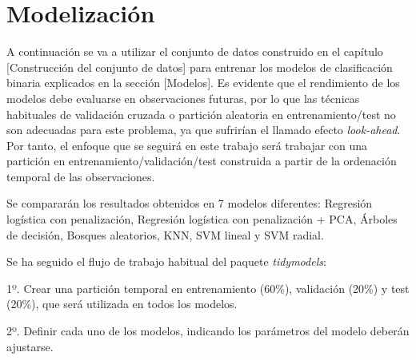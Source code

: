 \documentclass[12pt,a4paper,]{book}
\title{}
\author{Nombre Completo Autor}
\date{18/11/2021}
\def\ifdoblecara{} %
\def\ifprincipal{} %
\let\ifprincipal\undefined %
\numberwithin{dummy}{section}
\theoremstyle{ocrenumbox}
\theoremstyle{blacknumex}
\theoremstyle{blacknumbox}
\theoremstyle{ocrenum}
\theoremstyle{ocrenum}
\begin{document}




\raggedbottom

\ifdefined\ifprincipal
\else
\setlength{\parindent}{1em}
\pagestyle{fancy}
\setcounter{tocdepth}{4}
\tableofcontents

\fi

\ifdefined\ifdoblecara
\fancyhead{}{}
\fancyhead[LE,RO]{\scriptsize\rightmark}
\fancyfoot[LO,RE]{\scriptsize\slshape \leftmark}
\fancyfoot[C]{}
\fancyfoot[LE,RO]{\footnotesize\thepage}
\else
\fancyhead{}{}
\fancyhead[RO]{\scriptsize\rightmark}
\fancyfoot[LO]{\scriptsize\slshape \leftmark}
\fancyfoot[C]{}
\fancyfoot[RO]{\footnotesize\thepage}
\fi

\renewcommand{\headrulewidth}{0.4pt}
\renewcommand{\footrulewidth}{0.4pt}

\hypertarget{modelizaciuxf3n}{%
\chapter{Modelización}\label{modelizaciuxf3n}}

A continuación se va a utilizar el conjunto de datos construido en el
capítulo {[}Construcción del conjunto de datos{]} para entrenar los
modelos de clasificación binaria explicados en la sección {[}Modelos{]}.
Es evidente que el rendimiento de los modelos debe evaluarse en
observaciones futuras, por lo que las técnicas habituales de validación
cruzada o partición aleatoria en entrenamiento/test no son adecuadas
para este problema, ya que sufrirían el llamado efecto
\emph{look-ahead}. Por tanto, el enfoque que se seguirá en este trabajo
será trabajar con una partición en entrenamiento/validación/test
construida a partir de la ordenación temporal de las observaciones.

Se compararán los resultados obtenidos en 7 modelos diferentes:
Regresión logística con penalización, Regresión logística con
penalización + PCA, Árboles de decisión, Bosques aleatorios, KNN, SVM
lineal y SVM radial.

Se ha seguido el flujo de trabajo habitual del paquete
\emph{tidymodels}:

1º. Crear una partición temporal en entrenamiento (60\%), validación
(20\%) y test (20\%), que será utilizada en todos los modelos.

2º. Definir cada uno de los modelos, indicando los parámetros del modelo
deberán ajustarse.
\end{document}
